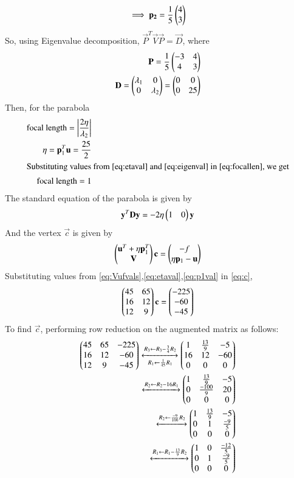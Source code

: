 \documentclass[journal,12pt,twocolumn]{IEEEtran}
\begin{document}
\begin{align}
    \implies\mathbf{p_2}=\frac{1}{5}\begin{pmatrix}4\\3\end{pmatrix}\label{eq:p2val}
\end{align}
So, using Eigenvalue decomposition, $\vec{P}^T\vec{V}\vec{P}=\vec{D}$, where
\begin{align}
    \mathbf{P} = \frac{1}{5}\begin{pmatrix}-3 & 4\\4 & 3\end{pmatrix}\\
    \mathbf{D} = \begin{pmatrix}\lambda_1 & 0\\0 & \lambda_2\end{pmatrix} = \begin{pmatrix}0 & 0\\ 0 & 25\end{pmatrix}
\end{align}
Then, for the parabola
\begin{align}
    \text{focal length} = \left\vert\frac{2\eta}{\lambda_2}\right\vert \label{eq:focallen}\\
    \eta = \mathbf{p}_1^T\mathbf{u} = \frac{25}{2}\label{eq:etaval}\\
    \intertext{Substituting values from \eqref{eq:etaval} and \eqref{eq:eigenval} in \eqref{eq:focallen}, we get}
    \text{focal length} = 1
\end{align}
The standard equation of the parabola is given by
\begin{align}
    \mathbf{y}^T\mathbf{D}\mathbf{y} = -2\eta\begin{pmatrix}1 & 0\end{pmatrix}\mathbf{y}
\end{align}
And the vertex $\vec{c}$ is given by
\begin{align}
    \begin{pmatrix}\mathbf{u}^T + \eta\mathbf{p}_1^T \\ \mathbf{V}\end{pmatrix}\mathbf{c} = \begin{pmatrix}-f \\ \eta\mathbf{p}_1 - \mathbf{u}\end{pmatrix} \label{eq:c}
\end{align}
Substituting values from \eqref{eq:Vufvals},\eqref{eq:etaval},\eqref{eq:p1val} in \eqref{eq:c},
\begin{align}
    \begin{pmatrix}45 & 65\\16 & 12\\12 & 9\end{pmatrix}\mathbf{c} = \begin{pmatrix}-225\\-60\\-45\end{pmatrix}
\end{align}
To find $\vec{c}$, performing row reduction on the augmented matrix as follows:
\begin{align}
    \begin{pmatrix}45 & 65 & -225\\16 & 12 & -60\\12 & 9 & -45\end{pmatrix}\xleftrightarrow[R_1\leftarrow \frac{1}{45}R_1]{R_3\leftarrow R_3-\frac{3}{4}R_2}\begin{pmatrix}1 & \frac{13}{9} & -5\\16 & 12 & -60\\0&0&0\end{pmatrix}\\
    \xleftrightarrow{R_2\leftarrow R_2-16R_1}\begin{pmatrix}1 & \frac{13}{9} & -5\\0 & \frac{-100}{9} & 20\\0&0&0\end{pmatrix}\\\xleftrightarrow{R_2\leftarrow \frac{-9}{100}R_2}\begin{pmatrix}1 & \frac{13}{9} & -5\\0 & 1 & \frac{-9}{5}\\0&0&0\end{pmatrix}\\\xleftrightarrow{R_1\leftarrow R_1-\frac{13}{9}R_2}\begin{pmatrix}1 & 0 & \frac{-12}{5}\\0 & 1 & \frac{-9}{5}\\0&0&0\end{pmatrix}
\end{align}
\end{document}
